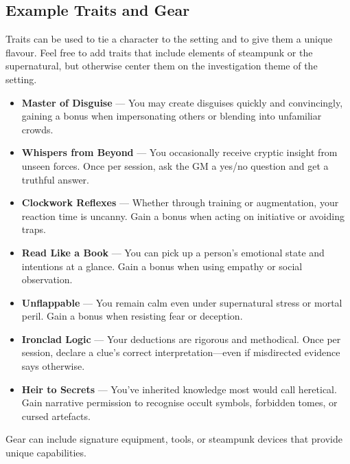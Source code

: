 \subsection{Example Traits and Gear}

Traits can be used to tie a character to the setting and to give them a unique flavour. Feel free to add traits that include elements of steampunk or the supernatural, but otherwise center them on the investigation theme of the setting.

\begin{itemize}\raggedright
  \item \textbf{Master of Disguise} — You may create disguises quickly and convincingly, gaining a bonus when impersonating others or blending into unfamiliar crowds.
  \item \textbf{Whispers from Beyond} — You occasionally receive cryptic insight from unseen forces. Once per session, ask the GM a yes/no question and get a truthful answer.
  \item \textbf{Clockwork Reflexes} — Whether through training or augmentation, your reaction time is uncanny. Gain a bonus when acting on initiative or avoiding traps.
  \item \textbf{Read Like a Book} — You can pick up a person’s emotional state and intentions at a glance. Gain a bonus when using empathy or social observation.
  \item \textbf{Unflappable} — You remain calm even under supernatural stress or mortal peril. Gain a bonus when resisting fear or deception.
  \item \textbf{Ironclad Logic} — Your deductions are rigorous and methodical. Once per session, declare a clue’s correct interpretation—even if misdirected evidence says otherwise.
  \item \textbf{Heir to Secrets} — You’ve inherited knowledge most would call heretical. Gain narrative permission to recognise occult symbols, forbidden tomes, or cursed artefacts.
\end{itemize}

\vspace{.75\baselineskip}
\noindent Gear can include signature equipment, tools, or steampunk devices that provide unique capabilities. 

